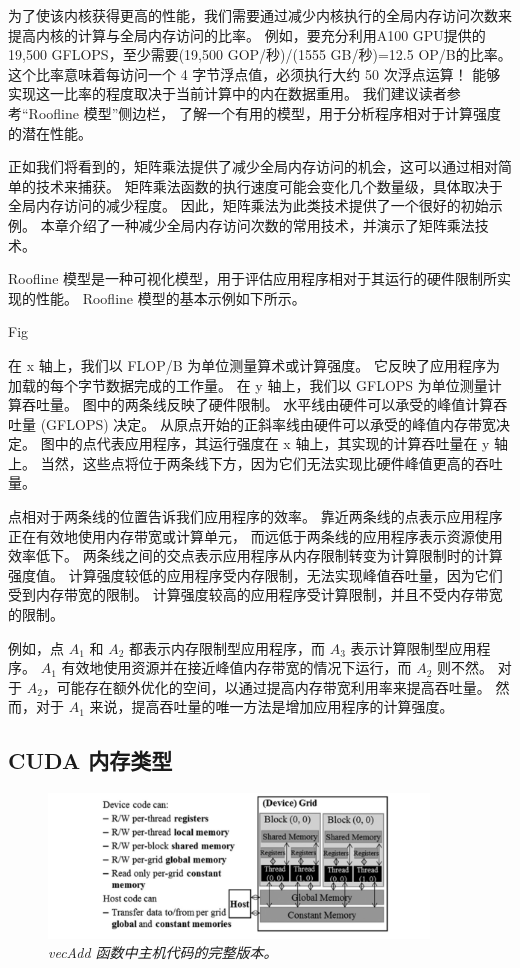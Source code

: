 为了使该内核获得更高的性能，我们需要通过减少内核执行的全局内存访问次数来提高内核的计算与全局内存访问的比率。 
例如，要充分利用A100 GPU提供的19,500 GFLOPS，至少需要(19,500 GOP/秒)/(1555 GB/秒)=12.5 OP/B的比率。 
这个比率意味着每访问一个 4 字节浮点值，必须执行大约 50 次浮点运算！ 
能够实现这一比率的程度取决于当前计算中的内在数据重用。 我们建议读者参考“Roofline 模型”侧边栏，
了解一个有用的模型，用于分析程序相对于计算强度的潜在性能。

正如我们将看到的，矩阵乘法提供了减少全局内存访问的机会，这可以通过相对简单的技术来捕获。 
矩阵乘法函数的执行速度可能会变化几个数量级，具体取决于全局内存访问的减少程度。 
因此，矩阵乘法为此类技术提供了一个很好的初始示例。 本章介绍了一种减少全局内存访问次数的常用技术，并演示了矩阵乘法技术。

\begin{remark}[Roofline 模型]
Roofline 模型是一种可视化模型，用于评估应用程序相对于其运行的硬件限制所实现的性能。 
Roofline 模型的基本示例如下所示。

{\color{red} Fig}

在 x 轴上，我们以 FLOP/B 为单位测量算术或计算强度。 它反映了应用程序为加载的每个字节数据完成的工作量。 
在 y 轴上，我们以 GFLOPS 为单位测量计算吞吐量。 图中的两条线反映了硬件限制。 
水平线由硬件可以承受的峰值计算吞吐量 (GFLOPS) 决定。 从原点开始的正斜率线由硬件可以承受的峰值内存带宽决定。 
图中的点代表应用程序，其运行强度在 x 轴上，其实现的计算吞吐量在 y 轴上。 
当然，这些点将位于两条线下方，因为它们无法实现比硬件峰值更高的吞吐量。

点相对于两条线的位置告诉我们应用程序的效率。 靠近两条线的点表示应用程序正在有效地使用内存带宽或计算单元，
而远低于两条线的应用程序表示资源使用效率低下。 两条线之间的交点表示应用程序从内存限制转变为计算限制时的计算强度值。 
计算强度较低的应用程序受内存限制，无法实现峰值吞吐量，因为它们受到内存带宽的限制。 
计算强度较高的应用程序受计算限制，并且不受内存带宽的限制。

例如，点 $A_1$ 和 $A_2$ 都表示内存限制型应用程序，而 $A_3$ 表示计算限制型应用程序。 
$A_1$ 有效地使用资源并在接近峰值内存带宽的情况下运行，而 $A_2$ 则不然。 
对于 $A_2$，可能存在额外优化的空间，以通过提高内存带宽利用率来提高吞吐量。 
然而，对于 $A_1$ 来说，提高吞吐量的唯一方法是增加应用程序的计算强度。
\end{remark}

\subsection{CUDA 内存类型}
\begin{figure}[H]
	\centering
	\includegraphics[width=0.9\textwidth]{figs/F5.2.png}
	\caption{\textit{\color{red} vecAdd 函数中主机代码的完整版本。}}
\end{figure}

